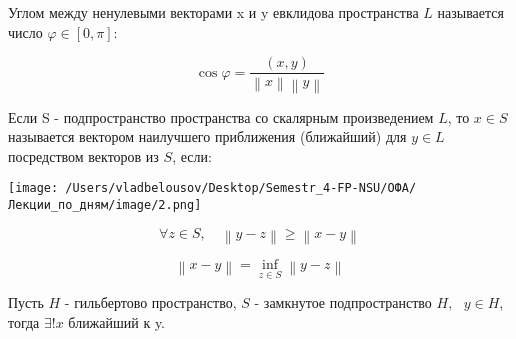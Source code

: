 \documentclass[12pt, a4paper]{report}
\begin{document}
\fi


\begin{definition}
     Углом между ненулевыми векторами x и y  евклидова пространства \( L  \)  называется число \( \varphi \in  [ 0, \pi ] \):

     \[ \cos \varphi = \frac{(x,y )}{\left\lVert x  \right\rVert \left\lVert y  \right\rVert}  \] 
\end{definition}

\begin{definition}
    Если S - подпространство пространства со скалярным произведением \( L \), то \( x \in  S  \)  называется вектором наилучшего приближения (ближайший) для \( y \in L      \)  посредством векторов из \( S  \), если: 

    \begin{center}
        \texttt{[image: /Users/vladbelousov/Desktop/Semestr\_4-FP-NSU/ОФА/Лекции\_по\_дням/image/2.png]}
    \end{center}

    \[ \forall z \in  S , \quad  \left\lVert y - z  \right\rVert \geq  \left\lVert x - y  \right\rVert \] 

    \[ \left\lVert x - y  \right\rVert  = \inf _{z \in  S } \left\lVert y -z  \right\rVert  \] 
\end{definition}

\begin{theorem}
    Пусть \( H  \)   - гильбертово пространство, \( S  \)   - замкнутое подпространство \( H , \text{  }  y \in  H  \), тогда \( \exists  ! x  \) ближайший к y.
\end{theorem}
\end{document}
